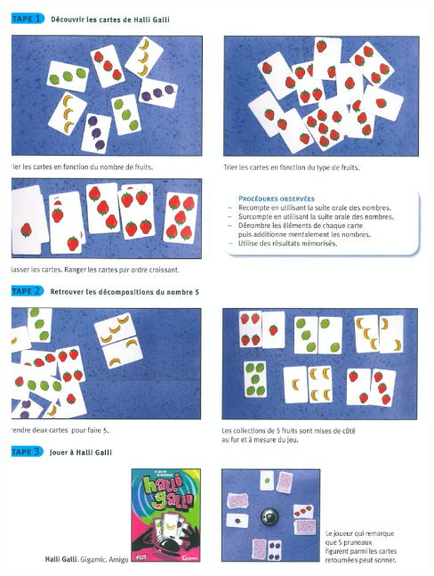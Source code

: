 \begin{exercice*}
\begin{center}
      \includegraphics[width=12.5cm]{Nombres_et_calculs_did/Images/Num3_activites_Halli_galli}
   \end{center}
\end{exercice*}




